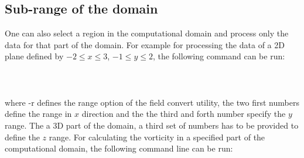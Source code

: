 \subsection{Sub-range of the domain}
One can also select a region in the computational domain and process only the data for that part of the domain. For example for processing the data of a 2D plane defined by $-2\leq x \leq 3$, $-1\leq y \leq 2$, the following command can be run:\\
\\
\\
\\
where -r defines the range option of the field convert utility, the two first numbers define the range in $x$ direction and the the third and forth number specify the $y$ range. The a 3D part of the domain, a third set of numbers has to be provided to define the $z$ range. For calculating the vorticity in a specified part of the computational domain, the following command line can be run:\\
\\
